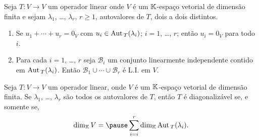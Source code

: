 \documentclass{beamer}
\begin{document}
    \begin{frame}
        \begin{teorema}
            Seja $T : V \to V$ um operador linear \pause onde $V$ é um $\mathbb{K}$-espaço vetorial de dimensão finita \pause e sejam $\lambda_1$, \pause \dots, \pause $\lambda_r$, \pause $r \ge 1$, autovalores de $T$, \pause dois a dois distintos.\pause
            \begin{enumerate}[label={\roman*})]
                \item\label{autovetorLI} Se $u_1 + \cdots + u_r = 0_V$ \pause com $u_i \in {\rm Aut\,}_T(\lambda_i)$; \pause $i = 1$, \dots, $r$; \pause então $u_i = 0_V$ \pause para todo $i$.\pause
                \item Para cada $i = 1$, \dots, $r$ \pause seja $\mathcal{B}_i$ \pause um conjunto linearmente independente \pause contido em ${\rm Aut\,}_T(\lambda_i)$. \pause Então $\mathcal{B}_1 \cup \cdots \cup \mathcal{B}_r$ \pause é L.I. em $V$.
            \end{enumerate}
        \end{teorema}
    \end{frame}

    \begin{frame}
        \begin{corolario}
            Seja $T : V \to V$ um operador linear, \pause onde $V$ é um $\mathbb{K}$-espaço vetorial \pause de dimensão finita. \pause Se $\lambda_1$, \pause \dots, \pause $\lambda_r$ \pause são todos os autovalores de $T$, \pause então $T$ é diagonalizável \pause se, e somente se,\pause
            \[
                \dim_\cp{K} V = \pause \sum_{i = i}^r\dim_\cp{K}\aut_T(\lambda_i).
            \]
        \end{corolario}
    \end{frame}
\end{document}

